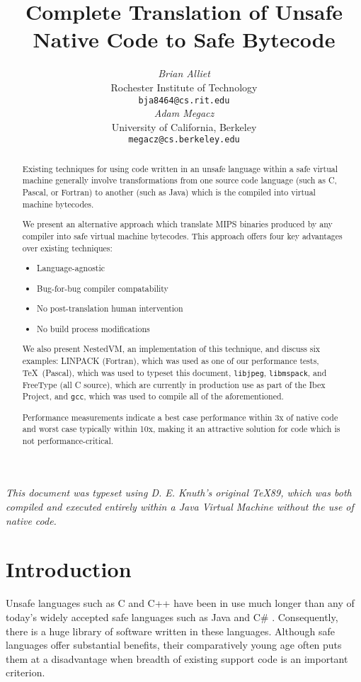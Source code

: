 \documentclass{acmconf}
\title{\textbf{\textsf{
Complete Translation of Unsafe Native Code to Safe Bytecode
}}}
\date{}
\author{\begin{tabular}{@{}c@{}}
        {\em {Brian Alliet}} \\
        {Rochester Institute of Technology}\\
        {\tt bja8464@cs.rit.edu}
   \end{tabular}\hskip 1in\begin{tabular}{@{}c@{}}
        {\em {Adam Megacz}} \\
        {University of California, Berkeley} \\
        {\tt megacz@cs.berkeley.edu}
\end{tabular}}
\begin{document}
\maketitle

{\it This document was typeset using D. E. Knuth's original \TeX 89,
     which was both compiled and executed entirely within a Java
     Virtual Machine without the use of native code.}

\begin{abstract}

Existing techniques for using code written in an unsafe language
within a safe virtual machine generally involve transformations from
one source code language (such as C, Pascal, or Fortran) to another
(such as Java) which is the compiled into virtual machine bytecodes.

We present an alternative approach which translate MIPS binaries
produced by any compiler into safe virtual machine bytecodes.  This
approach offers four key advantages over existing techniques:

\begin{itemize}
\item Language-agnostic
\item Bug-for-bug compiler compatability
\item No post-translation human intervention
\item No build process modifications
\end{itemize}

We also present NestedVM, an implementation of this technique, and
discuss six examples: LINPACK (Fortran), which was used as one of our
performance tests, \TeX\ (Pascal), which was used to typeset this
document, {\tt libjpeg}, {\tt libmspack}, and FreeType (all C source),
which are currently in production use as part of the Ibex Project, and
{\tt gcc}, which was used to compile all of the aforementioned.

Performance measurements indicate a best case performance within 3x of
native code and worst case typically within 10x, making it an
attractive solution for code which is not performance-critical.

\end{abstract}

\section{Introduction}

Unsafe languages such as C \cite{KR} and C++ \cite{soustroup} have
been in use much longer than any of today's widely accepted safe
languages such as Java \cite{java} and C\# \cite{csharp}.  Consequently, there is
a huge library of software written in these languages.  Although safe
languages offer substantial benefits, their comparatively young age
often puts them at a disadvantage when breadth of existing support
code is an important criterion.
\end{document}
